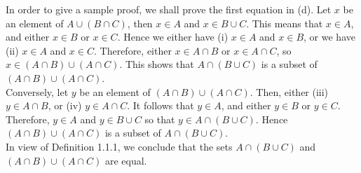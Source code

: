 In order to give a sample proof, we shall prove the first equation in (d).
Let $x$ be an element of $A\cup (B\cap C)$, then $x\in A$ and $x\in
B\cup C$.  This means that $x\in A$, and either $x\in B$ or $x\in C$.
Hence we either have (i) $x\in A$ and $x\in B$, or we have (ii) $x\in A$ and
$x\in C$. Therefore, either $x\in A\cap B$ or $x\in A\cap C$, so $x\in
(A\cap B) \cup (A\cap C)$.  This shows that $A\cap (B\cup C)$ is a
subset of $(A\cap
B)\cup (A\cap C)$.\\

Conversely, let $y$ be an element of $(A\cap B)\cup (A\cap C)$. Then,
either (iii) $y\in A\cap B$, or (iv) $y\in A\cap C$.  It follows that
$y\in A$, and either $y\in B$ or $y\in C$. Therefore, $y\in A$ and $y\in
B\cup C$ so that $y\in A \cap (B\cup C)$. Hence $(A\cap B) \cup
(A\cap C)$ is a subset of
$A\cap (B\cup C)$.\\

In view of Definition 1.1.1, we conclude that the sets $A\cap (B\cup C)$
and $(A \cap B) \cup (A\cap C)$ are equal.  
